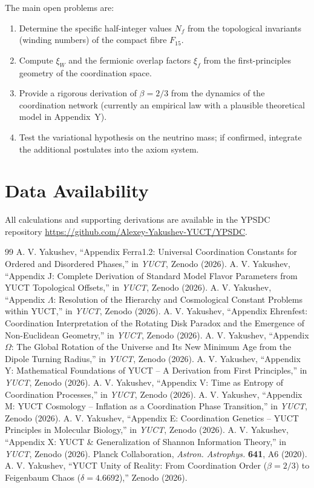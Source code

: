 \documentclass[12pt,a4paper]{article}
\begin{document}
	The main open problems are:
	\begin{enumerate}[label=(\roman*)]
		\item Determine the specific half-integer values \(N_f\) from the topological invariants (winding numbers) of the compact fibre \(F_{15}\).
		\item Compute \(\xi_W\) and the fermionic overlap factors \(\xi_f\) from the first-principles geometry of the coordination space.
		\item Provide a rigorous derivation of \(\beta = 2/3\) from the dynamics of the coordination network (currently an empirical law with a plausible theoretical model in Appendix~Y).
		\item Test the variational hypothesis on the neutrino mass; if confirmed, integrate the additional postulates into the axiom system.
	\end{enumerate}
	
	\section*{Data Availability}
	All calculations and supporting derivations are available in the YPSDC repository \url{https://github.com/Alexey-Yakushev-YUCT/YPSDC}.
	
	\begin{thebibliography}{99}
		 A. V. Yakushev, ``Appendix Ferra1.2: Universal Coordination Constants for Ordered and Disordered Phases,'' in \emph{YUCT}, Zenodo (2026).
		 A. V. Yakushev, ``Appendix J: Complete Derivation of Standard Model Flavor Parameters from YUCT Topological Offsets,'' in \emph{YUCT}, Zenodo (2026).
		 A. V. Yakushev, ``Appendix \(\Lambda\): Resolution of the Hierarchy and Cosmological Constant Problems within YUCT,'' in \emph{YUCT}, Zenodo (2026).
		 A. V. Yakushev, ``Appendix Ehrenfest: Coordination Interpretation of the Rotating Disk Paradox and the Emergence of Non-Euclidean Geometry,'' in \emph{YUCT}, Zenodo (2026).
		 A. V. Yakushev, ``Appendix \(\Omega\): The Global Rotation of the Universe and Its New Minimum Age from the Dipole Turning Radius,'' in \emph{YUCT}, Zenodo (2026).
		 A. V. Yakushev, ``Appendix Y: Mathematical Foundations of YUCT -- A Derivation from First Principles,'' in \emph{YUCT}, Zenodo (2026).
		 A. V. Yakushev, ``Appendix V: Time as Entropy of Coordination Processes,'' in \emph{YUCT}, Zenodo (2026).
		 A. V. Yakushev, ``Appendix M: YUCT Cosmology -- Inflation as a Coordination Phase Transition,'' in \emph{YUCT}, Zenodo (2026).
		 A. V. Yakushev, ``Appendix E: Coordination Genetics -- YUCT Principles in Molecular Biology,'' in \emph{YUCT}, Zenodo (2026).
		 A. V. Yakushev, ``Appendix X: YUCT \& Generalization of Shannon Information Theory,'' in \emph{YUCT}, Zenodo (2026).
		 Planck Collaboration, \emph{Astron. Astrophys.} \textbf{641}, A6 (2020).
		 A. V. Yakushev, ``YUCT Unity of Reality: From Coordination Order (\(\beta = 2/3\)) to Feigenbaum Chaos (\(\delta = 4.6692\)),'' Zenodo (2026).
	\end{thebibliography}
	
\end{document}

